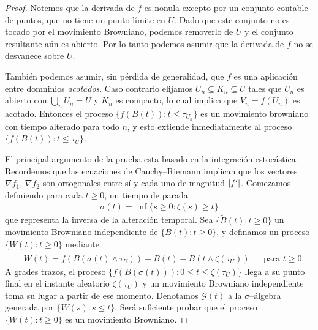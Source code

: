 \documentclass{article}
\DeclarePairedDelimiter{\abs}{\lvert}{\rvert}
\theoremstyle{plain}
\theoremstyle{remark}
\theoremstyle{definition}
\begin{document}
\begin{proof}
  Notemos que la derivada de \(f\) es nonula excepto por un conjunto contable de puntos, que no tiene un punto límite en \(U\).
  Dado que este conjunto no es tocado por el movimiento Browniano, podemos removerlo de \(U\) y el conjunto resultante aún es abierto.
  Por lo tanto podemos asumir que la derivada de \(f\) no se desvanece sobre \(U\).

  También podemos asumir, sin pérdida de generalidad, que \(f\) es una aplicación entre domninios \emph{acotados}.
  Caso contrario elijamos \(U_n \subseteq K_n \subseteq U\) tales que \(U_n\) es abierto con \(\bigcup_n U_n = U\) y \(K_n\) es compacto, lo cual implica que \(V_n = f(U_n)\) es acotado.
  Entonces el proceso \(\{f(B(t)) : t \leq \tau_{U_n}\}\) es un movimiento browniano con tiempo alterado para todo \(n\), y esto extiende inmediatamente al proceso \(\{f(B(t)) : t \leq \tau_U\}\).

  El principal argumento de la prueba esta basado en la integración estocástica.
  Recordemos que las ecuaciones de Cauchy--Riemann implican que los vectores \(\nabla f_1\), \(\nabla f_2\) son ortogonales entre sí y cada uno de magnitud \(\abs{f'}\).
  Comezamos definiendo para cada \(t \geq 0\), un tiempo de parada
  \begin{align}
    \sigma(t) = \inf \{s \geq 0 : \zeta(s) \geq t\}
  \end{align}
  que representa la inversa de la alteración temporal.
  Sea \(\{\widetilde{B}(t) : t \geq 0\}\) un movimiento Browniano independiente de \(\{B(t) : t \geq 0\}\), y definamos un proceso \(\{W(t) : t \geq 0\}\) mediante
  \begin{align}
    &W(t)
    =
    f(B(\sigma(t) \wedge \tau_U))
      + \widetilde{B}(t) - \widetilde{B}(t \wedge \zeta(\tau_U))
    &&\text{para } t \geq 0
  \end{align}
  A grades trazos, el proceso \(\{f(B(\sigma(t))) : 0 \leq t \leq \zeta(\tau_U)\}\) llega a su punto final en el instante aleatorio \(\zeta(\tau_U)\) y un movimiento Browniano independiente toma su lugar a partir de ese momento.
  Denotamos \(\mathcal{G}(t)\) a la \(\sigma\)--álgebra generada por \(\{W(s) : s \leq t\}\).
  Será suficiente probar que el proceso \(\{W(t) : t \geq 0\}\) es un movimiento Browniano.
  

\end{proof}
\end{document}
